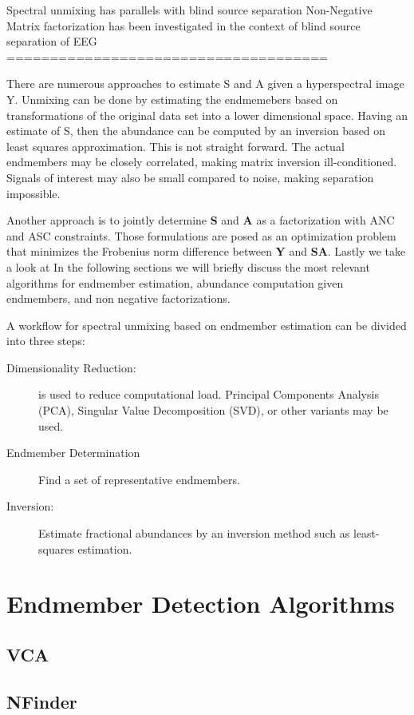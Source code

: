 Spectral unmixing has parallels with blind source separation
Non-Negative Matrix factorization has been investigated in the context of blind source separation of EEG\\
=====================================

There are numerous approaches to estimate S and A given a hyperspectral image Y.  Unmixing can be done by estimating the endmemebers based on transformations of the original data set into a lower dimensional space.  Having an estimate of S, then the abundance can be computed by an inversion based on least squares approximation.  This is not straight forward.  The actual endmembers may be closely correlated, making matrix inversion ill-conditioned.  Signals of interest may also be small compared to noise, making separation impossible.  

Another approach is to jointly determine \textbf{S} and \textbf{A} as a factorization with ANC and ASC constraints.  Those formulations are posed as an optimization problem that minimizes the Frobenius norm difference between \textbf{Y} and \textbf{SA}.  Lastly we take a look at In the following sections we will briefly discuss the most relevant algorithms for endmember estimation, abundance computation given endmembers, and non negative factorizations.

A workflow for spectral unmixing based on endmember estimation can be divided into three steps:
\begin{description}
	\item[Dimensionality Reduction:] is used to reduce computational load.  Principal Components Analysis (PCA), Singular Value Decomposition (SVD), or other variants may be used.
	\item[Endmember Determination] Find a set of representative endmembers.
	\item[Inversion:] Estimate fractional abundances by an inversion method such as least-squares estimation.
\end{description}

\section{Endmember Detection Algorithms}
\subsection{VCA}
\subsection{NFinder}

